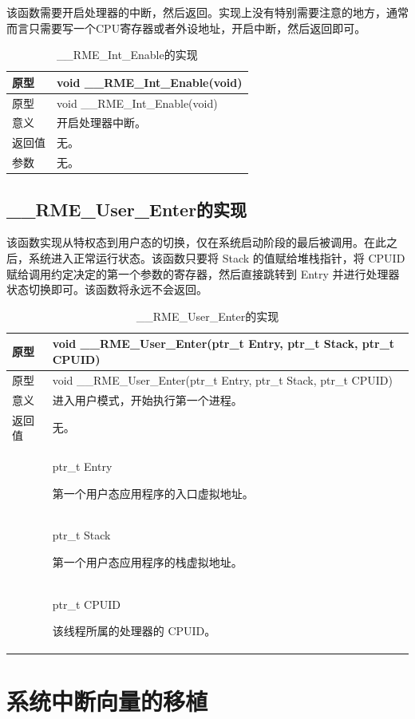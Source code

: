 该函数需要开启处理器的中断，然后返回。实现上没有特别需要注意的地方，通常而言只需要写一个CPU寄存器或者外设地址，开启中断，然后返回即可。

\begin{xltabular}{\textwidth}{@{}>{\hsize\raggedright\arraybackslash}X>{\hsize\raggedright\arraybackslash}X@{}}
\caption{\_\_RME\_Int\_Enable的实现}\label{tab:7-17-rme-int-enable-implementation}\\
\toprule
原型 & void \_\_RME\_Int\_Enable(void)\tabularnewline
\endfirsthead
\toprule
原型 & void \_\_RME\_Int\_Enable(void)\tabularnewline
\midrule
\endhead
\bottomrule
\endlastfoot
意义 & 开启处理器中断。\tabularnewline
返回值 & 无。\tabularnewline
参数 & 无。\tabularnewline
\end{xltabular}

\subsection{\_\_RME\_User\_Enter的实现}\label{subsec:7-rme-user-enter-implementation}

该函数实现从特权态到用户态的切换，仅在系统启动阶段的最后被调用。在此之后，系统进入正常运行状态。该函数只要将 Stack 的值赋给堆栈指针，将 CPUID 赋给调用约定决定的第一个参数的寄存器，然后直接跳转到 Entry 并进行处理器状态切换即可。该函数将永远不会返回。

\begin{xltabular}{\textwidth}{@{}>{\hsize\raggedright\arraybackslash}X>{\hsize\raggedright\arraybackslash}X@{}}
\caption{\_\_RME\_User\_Enter的实现}\label{tab:7-18-rme-user-enter-implementation}\\
\toprule
原型 & void \_\_RME\_User\_Enter(ptr\_t Entry, ptr\_t Stack, ptr\_t
CPUID)\tabularnewline
\endfirsthead
\toprule
原型 & void \_\_RME\_User\_Enter(ptr\_t Entry, ptr\_t Stack, ptr\_t
CPUID)\tabularnewline
\midrule
\endhead
\bottomrule
\endlastfoot
意义 & 进入用户模式，开始执行第一个进程。\tabularnewline
返回值 & 无。\tabularnewline
{} & ptr\_t Entry

第一个用户态应用程序的入口虚拟地址。\strut
\tabularnewline
\strut
 & ptr\_t Stack

第一个用户态应用程序的栈虚拟地址。\strut
\tabularnewline
\strut
 & ptr\_t CPUID

该线程所属的处理器的 CPUID。\strut
\tabularnewline
\end{xltabular}

\section{系统中断向量的移植}\label{sec:7-system-interrupt-vector-porting}

